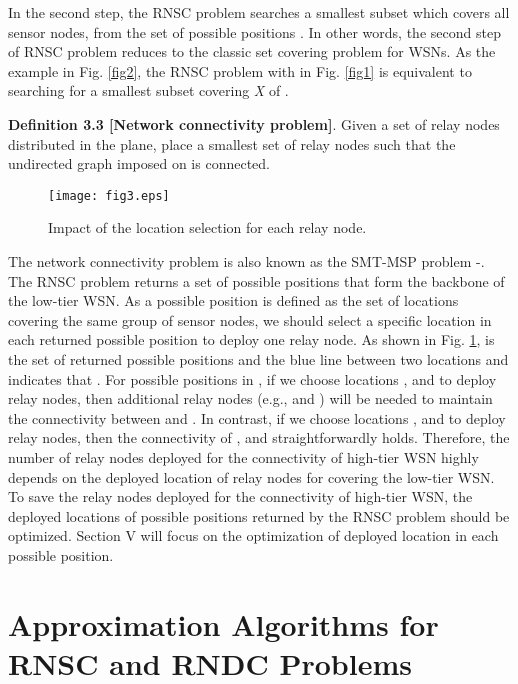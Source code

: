 \documentclass[journal]{IEEEtran}
\begin{document}
In the second step, the RNSC problem searches a smallest subset which covers all sensor nodes, from the set of possible positions . In other words, the second step of RNSC problem reduces to the classic set covering problem for WSNs. As the example in Fig. \ref{fig2}, the RNSC problem with  in Fig. \ref{fig1} is equivalent to searching for a smallest subset covering \emph{X} of .

\textbf{Definition 3.3 [Network connectivity problem]}. Given a set of relay nodes  distributed in the plane, place a smallest set of relay
nodes  such that the undirected graph  imposed on  is connected.

\begin{figure}
\begin{center}
\texttt{[image: fig3.eps]}    \caption{Impact of the location selection for each relay node.}
\label{fig3}                                 \end{center}                                 \end{figure}

The network connectivity problem is also known as the SMT-MSP problem
\cite{Lin99}-\cite{Dandekar12}. The RNSC problem returns a set of possible positions that form the backbone of the low-tier WSN. As a possible position is defined as the set of locations covering the same group of sensor nodes, we should select a specific location in each returned possible position to deploy one relay node. As shown in Fig. \ref{fig3},  is the set of returned possible positions and the blue line between two locations  and  indicates that . For possible positions in , if we choose locations ,  and  to deploy
relay nodes, then additional relay nodes (e.g.,  and ) will be needed to maintain the connectivity between  and . In contrast, if
we choose locations ,  and  to deploy relay nodes, then the connectivity of ,  and  straightforwardly holds. Therefore, the number of relay nodes deployed for the connectivity of high-tier WSN highly depends on the deployed location of relay nodes for covering the low-tier WSN. To save the relay nodes deployed for the connectivity of high-tier WSN, the deployed locations of possible positions returned by the RNSC problem should be optimized. Section V will focus on the optimization of deployed location in each possible position.

\section{Approximation Algorithms for RNSC and RNDC Problems}
\end{document}
